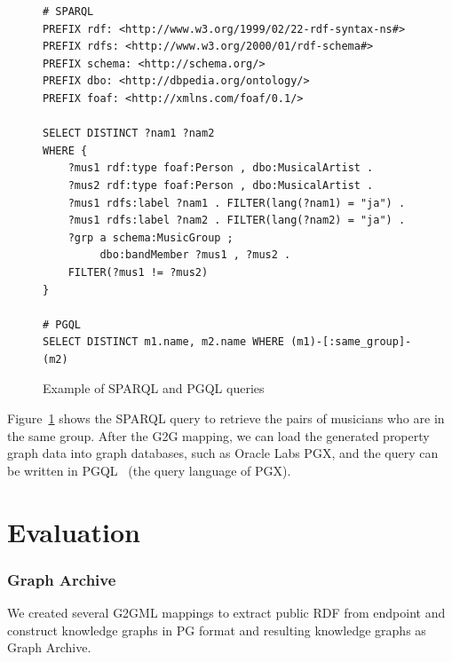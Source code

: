 \documentclass[runningheads]{llncs}
\begin{document}
\begin{figure}[!t]
\vspace{2mm}
\begin{scriptsize}
\begin{verbatim}
# SPARQL
PREFIX rdf: <http://www.w3.org/1999/02/22-rdf-syntax-ns#>
PREFIX rdfs: <http://www.w3.org/2000/01/rdf-schema#>
PREFIX schema: <http://schema.org/>
PREFIX dbo: <http://dbpedia.org/ontology/>
PREFIX foaf: <http://xmlns.com/foaf/0.1/>

SELECT DISTINCT ?nam1 ?nam2
WHERE {
    ?mus1 rdf:type foaf:Person , dbo:MusicalArtist .
    ?mus2 rdf:type foaf:Person , dbo:MusicalArtist .
    ?mus1 rdfs:label ?nam1 . FILTER(lang(?nam1) = "ja") .
    ?mus1 rdfs:label ?nam2 . FILTER(lang(?nam2) = "ja") .
    ?grp a schema:MusicGroup ;
         dbo:bandMember ?mus1 , ?mus2 .
    FILTER(?mus1 != ?mus2)
}

# PGQL
SELECT DISTINCT m1.name, m2.name WHERE (m1)-[:same_group]-(m2)
\end{verbatim}
\end{scriptsize}
\caption{Example of SPARQL and PGQL queries}
\label{fig:sparql}
\end{figure}

Figure~\ref{fig:sparql} shows the SPARQL query to retrieve the pairs of musicians who are in the same group. After the G2G mapping, we can load the generated property graph data into graph databases, such as Oracle Labs PGX, and the query can be written in PGQL~\cite{pgql} (the query language of PGX).


\section{Evaluation}


\subsubsection{Graph Archive}
We created several G2GML mappings to extract public RDF from endpoint and construct knowledge graphs in PG format and resulting knowledge graphs as Graph Archive.
\end{document}
